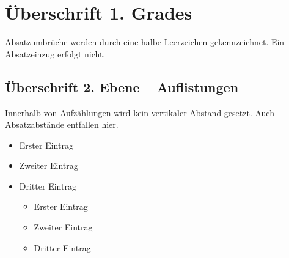 \begin{abstract}[english]
	This is an abstract. Abstracts should contain approximately 800 to 900 characters
	(incl. spaces). This is an abstract. Abstracts should contain approximately 800 to
	900 characters (incl. spaces). This is an abstract. Abstracts should contain
	approximately 800 to 900 characters (incl. spaces). This is an abstract. Abstracts
	should contain approximately 800 to 900 characters (incl. spaces). This is an
	abstract. Abstracts should contain approximately 800 to 900 characters (incl.
	spaces). This is an abstract. Abstracts should contain approximately 800 to 900
	characters (incl. spaces). This is an abstract. Abstracts should contain
	approximately 800 to 900 characters (incl. spaces). This is an abstract. Abstracts
	should contain approximately 800 to 900 characters (incl. spaces). This is an
	abstract. Abstracts should contain approximately 800 to 900 characters (incl.
	spaces). 
	
\end{abstract}

\clearpage

\section{Überschrift 1. Grades}

Absatzumbrüche werden durch eine halbe Leerzeichen gekennzeichnet. Ein Absatzeinzug erfolgt nicht. 

\blindtext

\subsection{Überschrift 2. Ebene – Auflistungen}

Innerhalb von Aufzählungen wird kein vertikaler Abstand gesetzt. Auch Absatzabstände entfallen hier.

\begin{itemize}
	\item Erster Eintrag
	\item Zweiter Eintrag
	\item Dritter Eintrag
	\begin{itemize}
		\item Erster Eintrag
		\item Zweiter Eintrag
		\item Dritter Eintrag
	\end{itemize}
\end{itemize}

